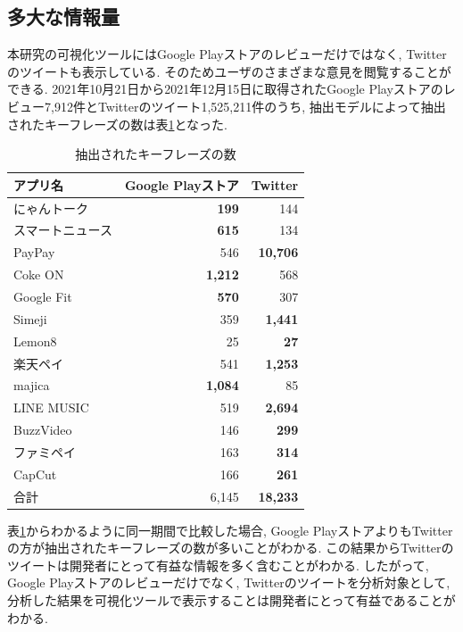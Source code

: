 \subsection{多大な情報量}
本研究の可視化ツールにはGoogle Playストアのレビューだけではなく, Twitterのツイートも表示している. そのためユーザのさまざまな意見を閲覧することができる. 
2021年10月21日から2021年12月15日に取得されたGoogle Playストアのレビュー7,912件とTwitterのツイート1,525,211件のうち, 抽出モデルによって抽出されたキーフレーズの数は表\ref{tb:app_count}となった. 

\begin{table}[H]
  \small
  \caption{抽出されたキーフレーズの数}
  \label{tb:app_count}
  \begin{center}
  \begin{tabularx}{\linewidth}{X|r|r}
    \hline
    アプリ名&Google Playストア&Twitter\\\hline\hline
    にゃんトーク&\textbf{199}&144\\\hline
    スマートニュース&\textbf{615}&134\\\hline
    PayPay&546&\textbf{10,706}\\\hline
    Coke ON&\textbf{1,212}&568\\\hline
    Google Fit&\textbf{570}&307\\\hline
    Simeji&359&\textbf{1,441}\\\hline
    Lemon8&25&\textbf{27}\\\hline
    楽天ペイ&541&\textbf{1,253}\\\hline
    majica&\textbf{1,084}&85\\\hline
    LINE MUSIC&519&\textbf{2,694}\\\hline
    BuzzVideo&146&\textbf{299}\\\hline
    ファミペイ&163&\textbf{314}\\\hline
    CapCut&166&\textbf{261}\\\hline\hline
    合計&6,145&\textbf{18,233}\\\hline
  \end{tabularx}\end{center}
\end{table}

\noindent
表\ref{tb:app_count}からわかるように同一期間で比較した場合, Google PlayストアよりもTwitterの方が抽出されたキーフレーズの数が多いことがわかる. 
この結果からTwitterのツイートは開発者にとって有益な情報を多く含むことがわかる. したがって, Google Playストアのレビューだけでなく, Twitterのツイートを分析対象として, 分析した結果を可視化ツールで表示することは開発者にとって有益であることがわかる. 

